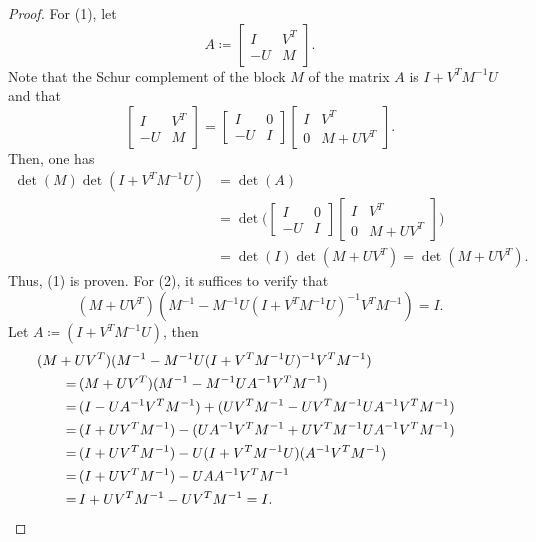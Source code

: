\begin{proof}
    For (1), let 
    \[
      A \coloneqq \begin{bmatrix} I & V^T \\ -U & M \end{bmatrix}.
    \]
    Note that the Schur complement of the block \(M\) of the matrix \(A\) is \(I + V^TM^{-1}U\) and that 
    \[
      \begin{bmatrix} I & V^T \\ -U & M \end{bmatrix} = 
      \begin{bmatrix} I & 0 \\ -U & I \end{bmatrix} \begin{bmatrix} I & V^T \\ 0 & M + UV^T \end{bmatrix}.
    \]
    Then, one has
    \begin{align*}
      \det(M)\det(I + V^TM^{-1}U) 
      &= \det(A) \\
      &= \det\bigg(\begin{bmatrix} I & 0 \\ -U & I \end{bmatrix} \begin{bmatrix} I & V^T \\ 0 & M + UV^T \end{bmatrix}\bigg) \\
      &= \det(I) \det(M+UV^T) = \det(M+UV^T).
    \end{align*}
    Thus, (1) is proven.
    For (2), it suffices to verify that 
    \[
        (M + UV^T)(M^{-1} - M^{-1}U(I + V^TM^{-1}U)^{-1}V^TM^{-1}) = I.
    \]
    Let \(A \coloneqq (I + V^TM^{-1}U)\), then
    \begin{align*}
        &\!\!\!\!\!\!\!\!\!\!\!\!\!\!\!\!\!\! (M + UV^T)(M^{-1} - M^{-1}U(I + V^TM^{-1}U)^{-1}V^TM^{-1})\\
        = \, &(M + UV^T)(M^{-1} - M^{-1}UA^{-1}V^TM^{-1})\\
        = \, &(I - UA^{-1}V^TM^{-1}) + (UV^TM^{-1} - UV^TM^{-1}UA^{-1}V^TM^{-1}) \\
        = \, &(I + UV^TM^{-1}) - (UA^{-1}V^TM^{-1} + UV^TM^{-1}UA^{-1}V^TM^{-1}) \\
        = \, &(I + UV^TM^{-1}) - U(I + V^TM^{-1}U)(A^{-1}V^TM^{-1}) \\
        = \, &(I + UV^TM^{-1}) - UAA^{-1}V^TM^{-1} \\
        = \, &I + UV^TM^{-1} - UV^TM^{-1} = I. \qedhere \\
    \end{align*}
\end{proof}

